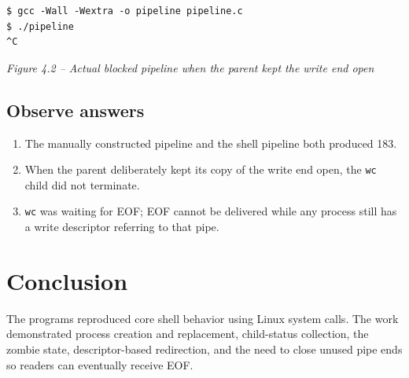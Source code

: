 \documentclass[12pt,a4paper]{article}
\newcommand{\figcap}[1]{\begin{center}\small\textit{#1}\end{center}\vspace{0.4em}}
\begin{document}
\begin{lstlisting}
$ gcc -Wall -Wextra -o pipeline pipeline.c
$ ./pipeline
^C
\end{lstlisting}
\figcap{Figure 4.2 -- Actual blocked pipeline when the parent kept the write end open}

\subsection{Observe answers}
\begin{enumerate}[label=\arabic*.]
\item The manually constructed pipeline and the shell pipeline both produced 183.
\item When the parent deliberately kept its copy of the write end open, the \texttt{wc} child did not terminate.
\item \texttt{wc} was waiting for EOF; EOF cannot be delivered while any process still has a write descriptor referring to that pipe.
\end{enumerate}

\section{Conclusion}
The programs reproduced core shell behavior using Linux system calls. The work demonstrated process creation and replacement, child-status collection, the zombie state, descriptor-based redirection, and the need to close unused pipe ends so readers can eventually receive EOF.
\end{document}

